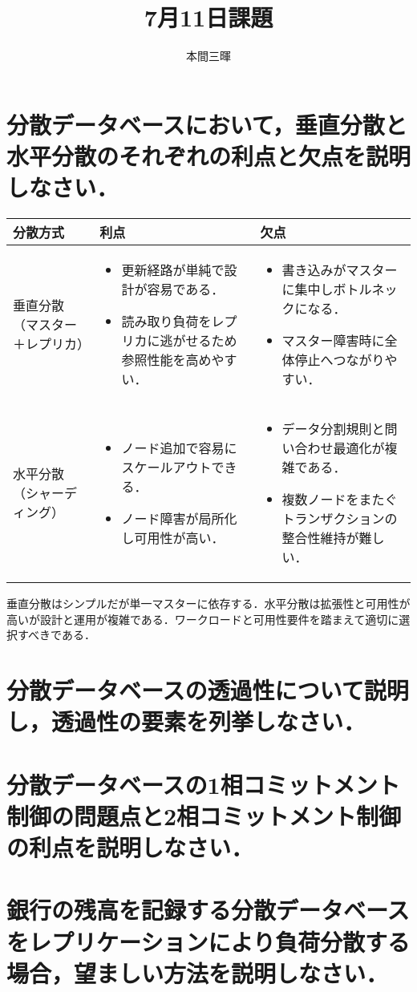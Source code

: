 \documentclass[titlepage,a4paper]{jsarticle}
\title{7月11日課題}
\author{本間三暉}
\begin{document}
\maketitle

\section{分散データベースにおいて，垂直分散と水平分散のそれぞれの利点と欠点を説明しなさい．}
\begin{table}[h]
\centering
\begin{tabular}{|l|p{6cm}|p{6cm}|}
\hline
分散方式 & 利点 & 欠点 \\ \hline
垂直分散（マスター＋レプリカ） &
\begin{itemize}\item 更新経路が単純で設計が容易である．\item 読み取り負荷をレプリカに逃がせるため参照性能を高めやすい．\end{itemize} &
\begin{itemize}\item 書き込みがマスターに集中しボトルネックになる．\item マスター障害時に全体停止へつながりやすい．\end{itemize} \\ \hline
水平分散（シャーディング） &
\begin{itemize}\item ノード追加で容易にスケールアウトできる．\item ノード障害が局所化し可用性が高い．\end{itemize} &
\begin{itemize}\item データ分割規則と問い合わせ最適化が複雑である．\item 複数ノードをまたぐトランザクションの整合性維持が難しい．\end{itemize} \\ \hline
\end{tabular}
\end{table}

\bigskip
垂直分散はシンプルだが単一マスターに依存する．水平分散は拡張性と可用性が高いが設計と運用が複雑である．ワークロードと可用性要件を踏まえて適切に選択すべきである．

\section{分散データベースの透過性について説明し，透過性の要素を列挙しなさい．}

\section{分散データベースの1相コミットメント制御の問題点と2相コミットメント制御の利点を説明しなさい．}

\section{銀行の残高を記録する分散データベースをレプリケーションにより負荷分散する場合，望ましい方法を説明しなさい．}
\end{document}
